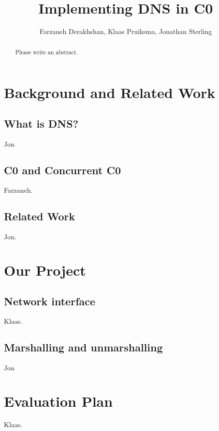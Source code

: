 \documentclass{article}
\title{Implementing DNS in C0}
\author{Farzaneh Derakhshan, Klaas Pruiksma, Jonathan Sterling}
\begin{document}
\maketitle

\begin{abstract}
  Please write an abstract.
\end{abstract}

\section{Background and Related Work}

\subsection{What is DNS?}

Jon

\subsection{C0 and Concurrent C0}

Farzaneh.

\subsection{Related Work}
Jon.

\section{Our Project}

\subsection{Network interface}

Klaas.

\subsection{Marshalling and unmarshalling}

Jon

\section{Evaluation Plan}

Klaas.



\end{document}
